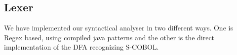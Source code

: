 \subsection{Lexer}
We have implemented our syntactical analyser in two different ways. One is Regex based, using compiled java patterns and the other is the direct implementation of the DFA recognizing S-COBOL.
